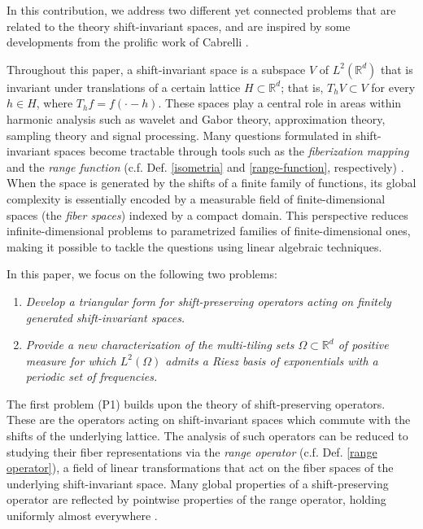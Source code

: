 \documentclass[a4paper,11pt]{amsart}
\theoremstyle{definition}
\theoremstyle{definition}
\def\R{\mathbb{R}}
\begin{document}
	In this contribution, we address two different yet connected problems that are related to the theory shift-invariant spaces, and are  inspired by some developments from the prolific work of Cabrelli \cite{ACCP,AAC,CC,CUC}.
	
	Throughout this paper, a shift-invariant space is a subspace $V$  of $L^2(\R^d)$ that is invariant under translations of a certain lattice $H\subset \R^d$; that is, $T_hV\subset V$ for every $h\in H$, where $T_hf = f(\cdot - h)$. These spaces play a central role in areas within harmonic analysis such as wavelet and Gabor theory, approximation theory, sampling theory and signal processing.  Many questions formulated in shift-invariant spaces become tractable through tools such as the \textit{fiberization mapping} and the \textit{range function} (c.f. Def. \ref{isometria} and \ref{range-function}, respectively) \cite{He64,BDR2,RS,B}.
	When the space is generated by the shifts of a finite family of functions, its global complexity is essentially encoded by a measurable field of finite-dimensional spaces (the \textit{fiber spaces}) indexed by a compact domain. This perspective reduces infinite-dimensional problems to parametrized families of finite-dimensional ones, making it possible to tackle the questions using linear algebraic techniques. 
	
	\medskip
	
	\noindent In this paper, we focus on the following two problems:
	\begin{enumerate}
		\item[(P1)]\label{p1} \textit{Develop a triangular form for shift-preserving operators acting on finitely generated shift-invariant spaces.}
		\item[(P2)]\label{p2} \textit{Provide a new characterization of the multi-tiling sets $\Omega\subset\R^d$ of positive measure for which $L^2(\Omega)$ admits a Riesz basis of exponentials with a periodic set of frequencies.}
	\end{enumerate}
	
	\medskip
	
	\noindent The first problem (P1) builds upon the theory of shift-preserving operators. These are the operators acting on shift-invariant spaces which commute with the shifts of the underlying lattice. The analysis of such operators can be reduced to studying their fiber representations via the \textit{range operator} (c.f. Def. \ref{range operator}), a field of linear transformations that act on the fiber spaces of the underlying shift-invariant space. Many global properties of a shift-preserving operator are reflected by pointwise properties of the range operator, holding uniformly almost everywhere \cite{B,BI2019}. 
	
\end{document}
